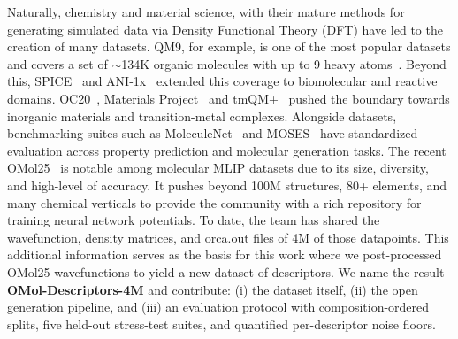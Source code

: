 Naturally, chemistry and material science, with their mature methods for generating simulated data via
Density Functional Theory (DFT) have led to the creation of many datasets. QM9, for example, is one of the
most popular datasets and covers a set of $\sim$134K organic molecules with up to 9 heavy atoms~\citep{qm9}.
Beyond this, SPICE~\citep{spice} and ANI-1x~\citep{ani1x} extended this coverage to biomolecular and reactive domains. OC20~\citep{oc20}, Materials Project~\citep{matproj}
and tmQM+~\citep{D5DD00220F} pushed the boundary towards inorganic materials and transition-metal complexes. Alongside datasets, benchmarking suites such as
MoleculeNet~\citep{moleculenet} and MOSES~\citep{moses} have standardized
evaluation across property prediction and molecular generation tasks. The recent OMol25~\citep{levine2026openmolecules2025omol25} is notable among molecular MLIP datasets due to 
its size, diversity, and high-level of accuracy. It pushes beyond 100M structures, 
80+ elements, and many chemical verticals to provide the community with a rich repository for 
training neural network potentials. To date, the team has shared the wavefunction, density matrices, 
and orca.out files of 4M of those datapoints. This additional information serves as the basis for this work 
where we post-processed OMol25 wavefunctions to yield a new dataset of descriptors. 
We name the result \textbf{OMol-Descriptors-4M} and contribute: (i) the dataset
itself, (ii) the open generation pipeline, and (iii) an evaluation protocol with
composition-ordered splits, five held-out stress-test suites, and quantified
per-descriptor noise floors.
